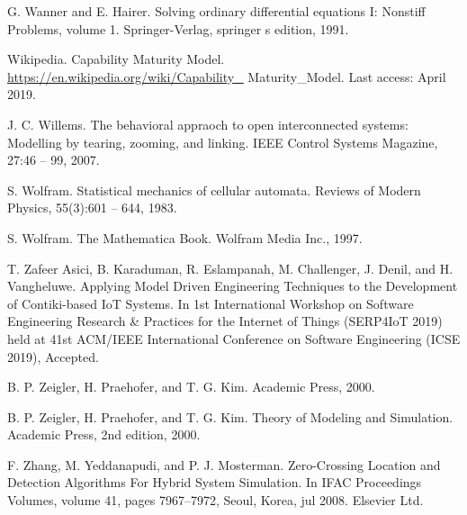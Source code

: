 \begin{description}[style=nextline,leftmargin=12mm,labelwidth=10mm,font=\normalfont]
\item[{[302]}] G. Wanner and E. Hairer. Solving ordinary differential equations I: Nonstiff Problems, volume 1. Springer-Verlag, springer s edition, 1991.

\item[{[303]}] Wikipedia. Capability Maturity Model. \url{https://en.wikipedia.org/wiki/Capability_} Maturity\_Model. Last access: April 2019.

\item[{[304]}] J. C. Willems. The behavioral appraoch to open interconnected systems: Modelling by tearing, zooming, and linking. IEEE Control Systems Magazine, 27:46 – 99, 2007.

\item[{[305]}] S. Wolfram. Statistical mechanics of cellular automata. Reviews of Modern Physics, 55(3):601 – 644, 1983.

\item[{[306]}] S. Wolfram. The Mathematica Book. Wolfram Media Inc., 1997.

\item[{[307]}] T. Zafeer Asici, B. Karaduman, R. Eslampanah, M. Challenger, J. Denil, and H. Vangheluwe. Applying Model Driven Engineering Techniques to the Development of Contiki-based IoT Systems. In 1st International Workshop on Software Engineering Research \& Practices for the Internet of Things (SERP4IoT 2019) held at 41st ACM/IEEE International Conference on Software Engineering (ICSE 2019), Accepted.

\item[{[308]}] B. P. Zeigler, H. Praehofer, and T. G. Kim. Academic Press, 2000.

\item[{[309]}] B. P. Zeigler, H. Praehofer, and T. G. Kim. Theory of Modeling and Simulation. Academic Press, 2nd edition, 2000.

\item[{[310]}] F. Zhang, M. Yeddanapudi, and P. J. Mosterman. Zero-Crossing Location and Detection Algorithms For Hybrid System Simulation. In IFAC Proceedings Volumes, volume 41, pages 7967–7972, Seoul, Korea, jul 2008. Elsevier Ltd.

\end{description}
